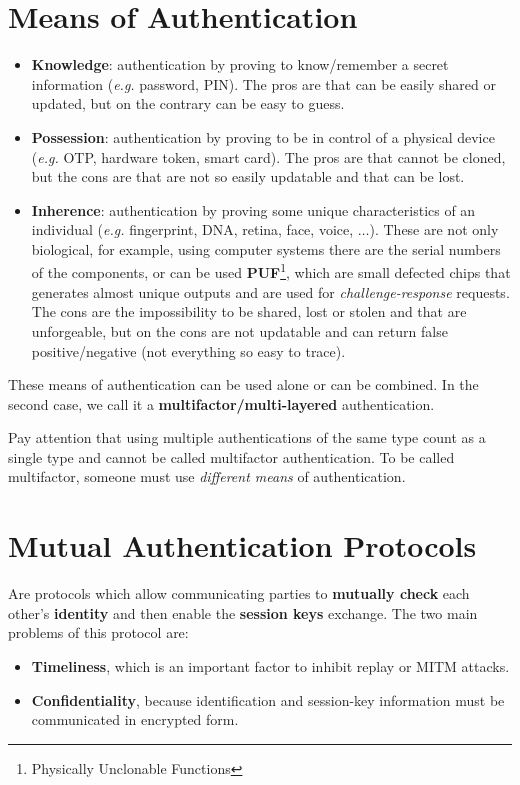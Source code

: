 \documentclass[oneside]{academica}
\begin{document}
\section{Means of Authentication}

\begin{itemize}
  \item \textbf{Knowledge}: authentication by proving to know/remember a secret information (\textit{e.g.} password, PIN). The pros are that can be easily shared or updated, but on the contrary can be easy to guess.
  \item \textbf{Possession}: authentication by proving to be in control of a physical device (\textit{e.g.} OTP, hardware token, smart card). The pros are that cannot be cloned, but the cons are that are not so easily updatable and that can be lost.
  \item \textbf{Inherence}: authentication by proving some unique characteristics of an individual (\textit{e.g.} fingerprint, DNA, retina, face, voice, $\ldots$). These are not only biological, for example, using computer systems there are the serial numbers of the components, or can be used \textbf{PUF}\footnote{Physically Unclonable Functions}, which are small defected chips that generates almost unique outputs and are used for \textit{challenge-response} requests. The cons are the impossibility to be shared, lost or stolen and that are unforgeable, but on the cons are not updatable and can return false positive/negative (not everything so easy to trace).
\end{itemize}

These means of authentication can be used alone or can be combined.
In the second case, we call it a \textbf{multifactor/multi-layered} authentication.

\begin{note}
  Pay attention that using multiple authentications of the same type count as a single type and cannot be called multifactor authentication. To be called multifactor, someone must use \textit{different means} of authentication.
\end{note}

\section{Mutual Authentication Protocols}

Are protocols which allow communicating parties to \textbf{mutually check} each other’s \textbf{identity} and then enable the \textbf{session keys} exchange.
The two main problems of this protocol are:
\begin{itemize}
  \item \textbf{Timeliness}, which is an important factor to inhibit replay or MITM attacks.
  \item \textbf{Confidentiality}, because identification and session-key information must be communicated in encrypted form.
\end{itemize}
\end{document}
